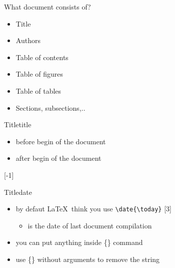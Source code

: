 \graphicspath{{sec01/images/s1z/}{sec01/code/s1/}}
\lstset{inputpath=sec01/code/s1/}

\begin{frame}{What document consists of?}\relax
\begin{itemize}
    \item Title
    \item Authors
    \item Table of contents
    \item Table of figures
    \item Table of tables
    \item Sections, subsections,..
\end{itemize}
     
\end{frame}

\begin{frame}[fragile]{Title}{title}\relax
\cprotect{}
\incPause
\begin{itemize}
     \item \ccol{\title} before begin of the document
     \item \ccol{\maketitle} after begin of the document 
\end{itemize}
[-1]
\end{frame}

\begin{frame}[fragile]{Title}{date}
 \cprotect{}
\incPause
\begin{itemize}
     \item by defaut \LaTeX\ think you use {\csk \verb|\date{\today}|}
     [3]
     \begin{itemize}
         \item \ccol{\today} is the date of last document compilation
     \end{itemize} 
     \incPause
     \item you can put anything inside \ccol{\date}\{\} command
     \item use \ccol{\date}\{\} without arguments to remove the string
\end{itemize}
\end{frame}


